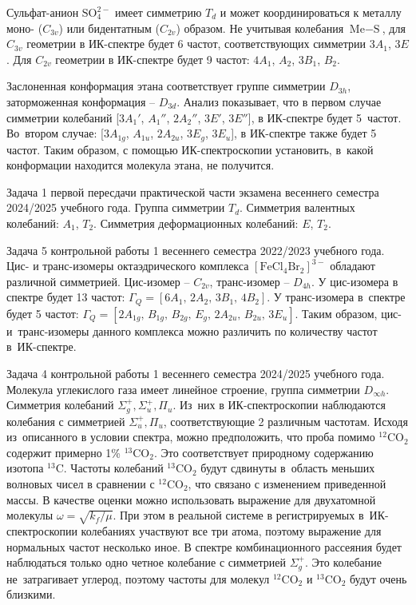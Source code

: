  Сульфат-анион $\text{SO}_4^{2-}$ имеет симметрию $T_d$ и может координироваться к металлу моно- ($C_{3v}$) или бидентатным ($C_{2v}$) образом. Не учитывая колебания $\text{Me}-\text{S}$, для $C_{3v}$ геометрии в ИК-спектре будет 6 частот, соответствующих симметрии $3A_1$, $3E$. Для $C_{2v}$ геометрии в ИК-спектре будет 9 частот: $4A_1$, $A_2$, $3B_1$, $B_2$.\par
{} Заслоненная конформация этана соответствует группе симметрии $D_{3h}$, заторможенная конформация – $D_{3d}$. Анализ показывает, что в первом случае симметрии колебаний [$3A_1'$, $A_1''$, $2 A_2''$, $3 E'$, $3 E''$], в ИК-спектре будет 5~частот. Во~втором случае: [$3 A_{1g}$, $A_{1u}$, $2 A_{2u}$, $3E_g$, $3 E_u$], в ИК-спектре также будет 5 частот. Таким образом, с помощью ИК-спектроскопии установить, в~какой конформации находится молекула этана, не получится.\par
{} Задача 1 первой пересдачи практической части экзамена весеннего семестра 2024/2025 учебного года. Группа симметрии $T_d$. Симметрия валентных колебаний: $A_1$, $T_2$. Симметрия деформационных колебаний: $E$, $T_2$.\par
{} Задача 5 контрольной работы 1 весеннего семестра 2022/2023 учебного года. Цис- и транс-изомеры октаэдрического комплекса $[\text{FeCl}_4\text{Br}_2]^{3-}$ обладают различной симметрией. Цис-изомер – $C_{2v}$, транс-изомер – $D_{4h}$. У цис-изомера в спектре будет 13 частот: $\Gamma_Q = \left[ 6 A_1\text{,}\,\,2 A_2\text{,}\,\,3 B_1\text{,}\,\,4 B_2 \right]$. У транс-изомера в~спектре будет 5 частот: $\Gamma_Q = \left[2A_{1g}\text{,} \,\, B_{1g}\text{,}\,\, B_{2g}\text{,}\,\, E_g\text{,}\,\, 2 A_{2u}\text{,}\,\, B_{2u}\text{,}\,\, 3  E_u \right]$. Таким образом, цис- и~транс-изомеры данного комплекса можно различить по количеству частот в~ИК-спектре.\par
{} Задача 4 контрольной работы 1 весеннего семестра 2024/2025 учебного года. Молекула углекислого газа имеет линейное строение, группа симметрии $D_{\infty h}$. Симметрия колебаний $\Sigma_g^+\text{,}\, \Sigma_u^+\text{,}\,\Pi_u$. Из~них в ИК-спектроскопии наблюдаются колебания с симметрией $\Sigma_u^+\text{,}\,\Pi_u$, соответствующие 2 различным частотам. Исходя из~описанного в условии спектра, можно предположить, что проба помимо $^{12}\text{CO}_2$ содержит примерно 1\% $^{13}\text{CO}_2$. Это соответствует природному содержанию изотопа $^{13}\text{C}$. Частоты колебаний $^{13}\text{CO}_2$ будут сдвинуты в~область меньших волновых чисел в сравнении с $^{12}\text{CO}_2$, что связано с изменением приведенной массы. В качестве оценки можно использовать выражение для двухатомной молекулы $\omega=\sqrt{k_f/\mu}$. При этом в реальной системе в регистрируемых в~ИК\nobreakdash-спектроскопии колебаниях участвуют все три атома, поэтому выражение для нормальных частот несколько иное. В спектре комбинационного рассеяния будет наблюдаться только одно четное колебание с симметрией $\Sigma_g^+$. Это колебание не~затрагивает углерод, поэтому частоты для молекул $^{12}\text{CO}_2$ и $^{13}\text{CO}_2$ будут очень близкими.\par

